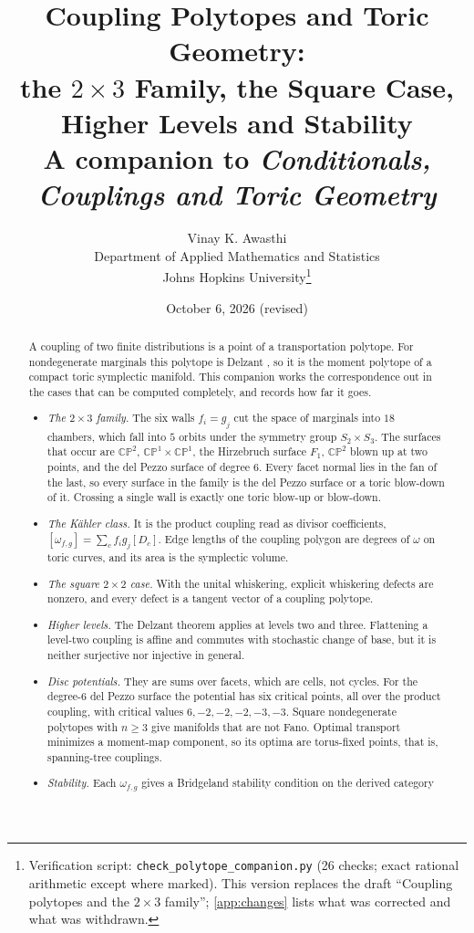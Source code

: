 \documentclass[11pt]{article}
\title{Coupling Polytopes and Toric Geometry:\\
the $2\times3$ Family, the Square Case, Higher Levels and Stability\\[4pt]
\large A companion to \emph{Conditionals, Couplings and Toric Geometry}}
\author{Vinay K. Awasthi\\
Department of Applied Mathematics and Statistics\\
Johns Hopkins University\thanks{Verification script: \texttt{check\_polytope\_companion.py}
(26 checks; exact rational arithmetic except where marked). This version replaces the draft
``Coupling polytopes and the $2\times3$ family''; \cref{app:changes} lists what was corrected and
what was withdrawn.}}
\date{October 6, 2026 (revised)}
\theoremstyle{definition}
\theoremstyle{remark}
\newcommand{\CP}{\mathbb{CP}}
\begin{document}
\maketitle

\begin{abstract}
A coupling of two finite distributions is a point of a transportation polytope. For nondegenerate
marginals this polytope is Delzant \cite{Conditionals}, so it is the moment polytope of a compact
toric symplectic manifold. This companion works the correspondence out in the cases that can be
computed completely, and records how far it goes.
\begin{itemize}[leftmargin=*]
\item \emph{The $2\times3$ family.} The six walls $f_i=g_j$ cut the space of marginals into $18$
  chambers, which fall into $5$ orbits under the symmetry group $S_2\times S_3$. The surfaces that occur
  are $\CP^2$, $\CP^1\times\CP^1$, the Hirzebruch surface $F_1$, $\CP^2$ blown up at two points, and
  the del Pezzo surface of degree $6$. Every facet normal lies in the fan of the last, so every surface
  in the family is the del Pezzo surface or a toric blow-down of it. Crossing a single wall is exactly
  one toric blow-up or blow-down.
\item \emph{The Kähler class.} It is the product coupling read as divisor coefficients,
  $[\omega_{f,g}]=\sum_cf_ig_j[D_c]$. Edge lengths of the coupling polygon are degrees of $\omega$ on
  toric curves, and its area is the symplectic volume.
\item \emph{The square $2\times2$ case.} With the unital whiskering, explicit whiskering defects are
  nonzero, and every defect is a tangent vector of a coupling polytope.
\item \emph{Higher levels.} The Delzant theorem applies at levels two and three. Flattening a level-two
  coupling is affine and commutes with stochastic change of base, but it is neither surjective nor
  injective in general.
\item \emph{Disc potentials.} They are sums over facets, which are cells, not cycles. For the degree-6
  del Pezzo surface the potential has six critical points, all over the product coupling, with critical
  values $6,-2,-2,-2,-3,-3$. Square nondegenerate polytopes with $n\ge3$ give manifolds that are not
  Fano. Optimal transport minimizes a moment-map component, so its optima are torus-fixed points,
  that is, spanning-tree couplings.
\item \emph{Stability.} Each $\omega_{f,g}$ gives a Bridgeland stability condition on the derived category

\end{itemize}
\end{abstract}
\end{document}
